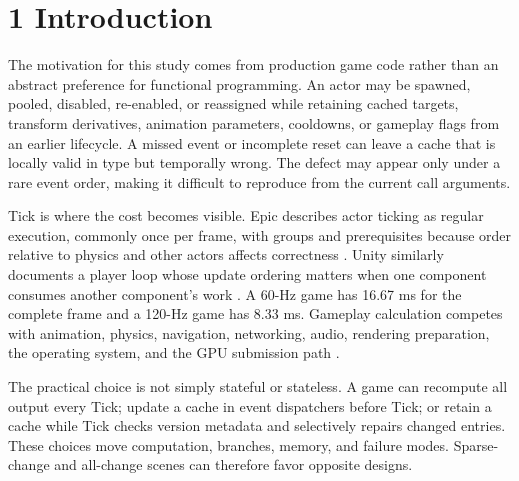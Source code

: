 \begin{abstract}
For practical calibration, p99 reaching 1 ms is defined as a noticeable subsystem spike proxy. It is an engineering threshold, not a universal perception boundary. All total paths remained below it at 262,144 vec3 multiplications plus 262,144 vec3 additions (1,572,864 scalar operations). Event dispatch first crossed at 393,216 of each vector operation (2,359,296 scalar operations); full and selective recomputation first crossed at 524,288 of each (3,145,728 scalar operations). Event work stayed outside critical Tick but still consumed frame CPU time. Working memory at 4,096 entities ranged from 144 KiB for full recomputation, through 144--256 KiB for event state, to 176--288 KiB for the selective hybrid.
\end{abstract}

\section{1 Introduction}

The motivation for this study comes from production game code rather than an abstract preference for functional programming. An actor may be spawned, pooled, disabled, re-enabled, or reassigned while retaining cached targets, transform derivatives, animation parameters, cooldowns, or gameplay flags from an earlier lifecycle. A missed event or incomplete reset can leave a cache that is locally valid in type but temporally wrong. The defect may appear only under a rare event order, making it difficult to reproduce from the current call arguments.

Tick is where the cost becomes visible. Epic describes actor ticking as regular execution, commonly once per frame, with groups and prerequisites because order relative to physics and other actors affects correctness \cite{epicticking,epicactortick}. Unity similarly documents a player loop whose update ordering matters when one component consumes another component's work \cite{unityupdate}. A 60-Hz game has 16.67 ms for the complete frame and a 120-Hz game has 8.33 ms. Gameplay calculation competes with animation, physics, navigation, networking, audio, rendering preparation, the operating system, and the GPU submission path \cite{gregory2019}.

The practical choice is not simply stateful or stateless. A game can recompute all output every Tick; update a cache in event dispatchers before Tick; or retain a cache while Tick checks version metadata and selectively repairs changed entries. These choices move computation, branches, memory, and failure modes. Sparse-change and all-change scenes can therefore favor opposite designs.

